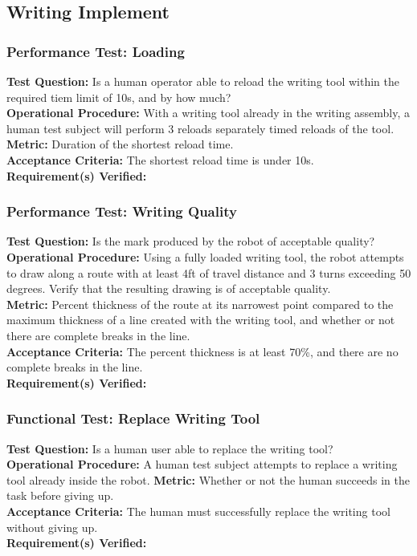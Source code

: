 
\subsection{Writing Implement}
\label{sec:verification_writing_implement}

\subsubsection{Performance Test: Loading}
\label{test:writing_pt_load}
\textbf{Test Question:} Is a human operator able to reload the writing tool within the required tiem limit of 10s, and by how much? \\
\textbf{Operational Procedure:} With a writing tool already in the writing assembly, a human test subject will perform 3 reloads separately timed reloads of the tool. \\
\textbf{Metric:} Duration of the shortest reload time. \\
\textbf{Acceptance Criteria:} The shortest reload time is under 10s. \\
\textbf{Requirement(s) Verified:} 

\subsubsection{Performance Test: Writing Quality}
\label{test:writing_pt_qual}
\textbf{Test Question:} Is the mark produced by the robot of acceptable quality? \\
\textbf{Operational Procedure:} Using a fully loaded writing tool, the robot attempts to draw along a route with at least 4ft of travel distance and 3 turns exceeding 50 degrees. Verify that the resulting drawing is of acceptable quality. \\
\textbf{Metric:} Percent thickness of the route at its narrowest point compared to the maximum thickness of a line created with the writing tool, and whether or not there are complete breaks in the line. \\
\textbf{Acceptance Criteria:} The percent thickness is at least 70\%, and there are no complete breaks in the line. \\
\textbf{Requirement(s) Verified:}  \\

\subsubsection{Functional Test: Replace Writing Tool}
\label{test:writing_ft_replace}
\textbf{Test Question:} Is a human user able to replace the writing tool? \\
\textbf{Operational Procedure:} A human test subject attempts to replace a writing tool already inside the robot.
\textbf{Metric:} Whether or not the human succeeds in the task before giving up.\\
\textbf{Acceptance Criteria:} The human must successfully replace the writing tool without giving up.  \\
\textbf{Requirement(s) Verified:} \\

